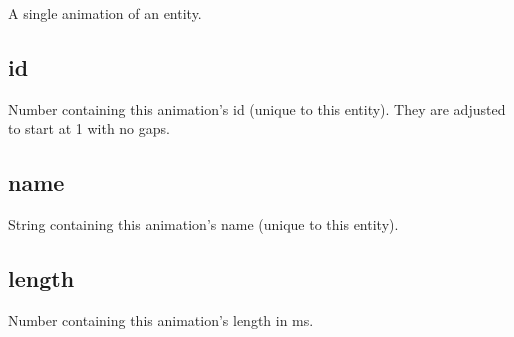 \documentclass{article}
\begin{document}
A single animation of an entity.


\subsection{id}

Number containing this animation's id (unique to this entity). They are adjusted to start at 1 with no gaps.


\subsection{name}

String containing this animation's name (unique to this entity).


\subsection{length}

Number containing this animation's length in ms.
\end{document}
